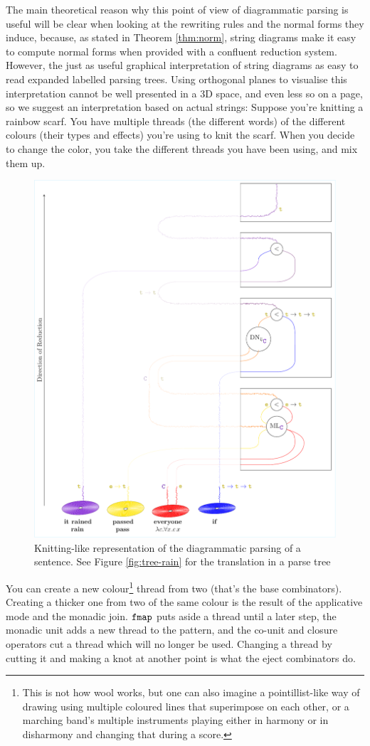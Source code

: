 The main theoretical reason why this point of view of diagrammatic parsing is
useful will be clear when looking at the rewriting rules and the normal forms
they induce, because, as stated in Theorem \ref{thm:norm}, string
diagrams make it easy to compute normal forms when provided with a confluent
reduction system.
However, the just as useful graphical interpretation of string diagrams as
easy to read expanded labelled parsing trees.
Using orthogonal planes to visualise this interpretation cannot be well
presented in a 3D space, and even less so on a page, so we suggest an
interpretation based on actual strings:
Suppose you're knitting a rainbow scarf.
You have multiple threads (the different words) of the different colours (their
types and effects) you're using to knit the scarf.
When you decide to change the color, you take the different threads you have
been using, and mix them up.

\begin{figure}
	\centering
	\includegraphics[width=.5\textwidth]{3d-parsing-diagram}
	\caption{Knitting-like representation of the diagrammatic parsing of a sentence. See Figure \ref{fig:tree-rain} for the translation in a parse tree}
	\label{fig:3dparsing-diagram}
\end{figure}

You can create a new colour\footnote{This is not how wool works, but
	one can also imagine a pointillist-like way of drawing using multiple
	coloured lines that superimpose on each other, or a marching band's multiple
	instruments playing either in harmony or in disharmony and changing that
	during a score.} thread from two (that's the base combinators).
Creating a thicker one from two of the same colour is the result of the
applicative mode and the monadic join.
$\texttt{fmap}$ puts aside a thread until a later step, the monadic unit adds a new
thread to the pattern, and the co-unit and closure operators cut a thread which
will no longer be used.
Changing a thread by cutting it and making a knot at another point is what the
eject combinators do.

